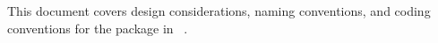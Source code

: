 This document covers design considerations, naming conventions, and coding conventions for the \muelu package in
\trilinos~\cite{TrilinosOverview}.
